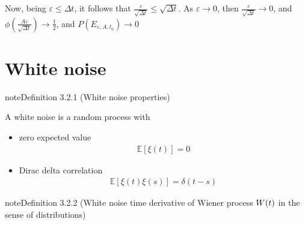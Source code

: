\documentclass[letterpaper,10pt,english]{jupyterBook}
\begin{document}
\sphinxAtStartPar
Now, being \(\varepsilon \le \Delta t\), it follows that \(\frac{\varepsilon}{\sqrt{\Delta t}} \le \sqrt{\Delta t}\). As \(\varepsilon \rightarrow 0\), then \(\frac{\varepsilon}{\sqrt{\Delta t}} \rightarrow 0\), and \(\phi\left( \frac{A \varepsilon}{\sqrt{\Delta t}} \right) \rightarrow \frac{1}{2}\), and \(P(E_{\varepsilon,A,t_0}) \rightarrow 0\)

\sphinxstepscope


\section{White noise}
\label{\detokenize{ch/prob/white-noise:white-noise}}\label{\detokenize{ch/prob/white-noise:prob-processes-wn}}\label{\detokenize{ch/prob/white-noise::doc}}\label{ch/prob/white-noise:wn:def:properties}
\begin{sphinxadmonition}{note}{Definition 3.2.1 (White noise \sphinxhyphen{} properties)}



\sphinxAtStartPar
A white noise is a random process with
\begin{itemize}
\item {} 
\sphinxAtStartPar
zero expected value
\begin{equation*}
\begin{split}\mathbb{E}[ \xi(t) ] = 0\end{split}
\end{equation*}
\item {} 
\sphinxAtStartPar
Dirac delta correlation
\begin{equation*}
\begin{split}\mathbb{E}[ \xi(t) \xi(s) ] = \delta(t-s)\end{split}
\end{equation*}
\end{itemize}
\end{sphinxadmonition}

\sphinxAtStartPar
{} 
\label{ch/prob/white-noise:wn:def:derivative}
\begin{sphinxadmonition}{note}{Definition 3.2.2 (White noise \sphinxhyphen{} time derivative of Wiener process \protect\(W(t)\protect\) in the sense of distributions)}


\end{sphinxadmonition}

\sphinxstepscope
\end{document}
